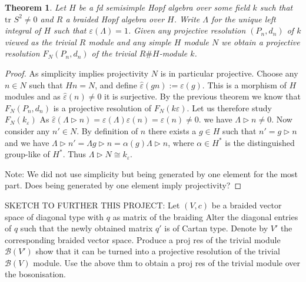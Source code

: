 \documentclass{amsart}
\newtheorem{theorem}{Theorem}
\theoremstyle{definition}
\newcommand{\Nichols}[1]{\ensuremath{\mathcal{B}(#1)}}
\begin{document}
	\begin{theorem}
		Let $H$ be a fd semisimple Hopf algebra over some field $k$ such that $\text{tr }S^2 \neq 0$ and $R$ a braided Hopf algebra over $H$. 
		Write $\Lambda$ for the unique left integral of $H$ such that $\varepsilon(\Lambda) =1$.
		Given any projective resolution $(P_n, d_n)$ of $k$ viewed as the trivial $R$ module and any simple $H$ module $N$ we obtain a projective resolution $F_N(P_n, d_n)$ of the trivial $R\#H$-module $k$.
	\end{theorem}
	\begin{proof}
		As simplicity implies projectivity $N$ is in particular projective.
		Choose any $n\in N$ such that $Hn =N$, and define $\widehat \varepsilon(g n):=\varepsilon(g)$. This is a morphism of $H$ modules and  as $\widehat \varepsilon(n) \neq 0$ it is surjective. 
		By the previous theorem we know that $F_N(P_n,d_n)$ is a projective resolution of $F_N(k\varepsilon)$. 
		Let us therefore study $F_N(k_\varepsilon)$
		As 
		$
		\widehat \varepsilon(\Lambda \triangleright n)= \varepsilon(\Lambda) \widehat \varepsilon(n) = \varepsilon(n) \neq 0.
		$
		we have $\Lambda \triangleright n \neq 0$.
		Now consider any $n' \in N$. By definition of $n$ there exists a $g\in H$ such that $n' = g \triangleright n$ and we have
		$\Lambda \triangleright n' = \Lambda g \triangleright n = \alpha (g) \Lambda \triangleright n$, where $\alpha \in H^*$ is the distinguished group-like of $H^*$.  Thus $\Lambda \triangleright N \cong k_\varepsilon$.
		
		Note: We did not use simplicity but being generated by one element for the most part. Does being generated by one element imply projectivity?
	\end{proof}
	
	
	SKETCH  TO FURTHER THIS PROJECT:
	Let $(V,c)$ be a braided vector space of diagonal type with $q$ as matrix of the braiding 
	Alter the diagonal entries of $q$ such that the newly obtained matrix $q'$ is of Cartan type.
	Denote by $V'$ the corresponding braided  vector space. Produce a proj res of the trivial module $\Nichols {V'}$ show that it can be turned into a projective resolution  of the trivial $\Nichols V$ module.
	Use the above thm to obtain a proj res of the trivial module over the bosonisation.
	
\end{document}
